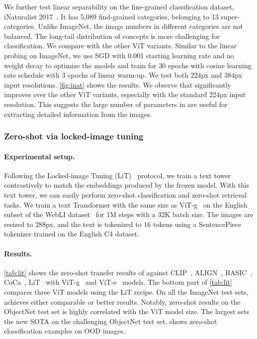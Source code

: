 We further test linear separability on the fine-grained classification dataset, iNaturalist 2017~\citep{cui2018large}. It has 5,089 find-grained categories, belonging to 13 super-categories. Unlike ImageNet, the image numbers in different categories are not balanced. The long-tail distribution of concepts is more challenging for classification. We compare \chonk with the other ViT variants. 
Similar to the linear probing on ImageNet, we use SGD with 0.001 starting learning rate and no weight decay to optimize the models and train for 30 epochs with cosine learning rate schedule with 3 epochs of linear warm-up. We test both $224$px and $384$px input resolutions. \cref{fig:inat} shows the results. We observe that \chonk significantly improves over the other ViT variants, especially with the standard $224$px input resolution. This suggests the large number of parameters in \chonk are useful for extracting detailed information from the images. 

\subsubsection{Zero-shot via locked-image tuning}
\label{sect::lit}
\paragraph{Experimental setup.}
Following the Locked-image Tuning (LiT)~\citep{lit} protocol, we train a text tower contrastively to match the embeddings produced by the frozen \chonk model.
With this text tower, we can easily perform zero-shot classification and zero-shot retrieval tasks.
We train a text Transformer with the same size as ViT-g~\citep{zhai2022scaling} on the English subset of the WebLI dataset~\citep{chen2022pali} for 1M steps with a 32K batch size.
The images are resized to $288$px, and the text is tokenized to 16 tokens using a SentencePiece~\citep{kudo-richardson-2018-sentencepiece} tokenizer trained on the English C4 dataset.

\paragraph{Results.}
\cref{tab:lit} shows the zero-shot transfer results of \chonk against CLIP~\citep{clip}, ALIGN~\citep{align}, BASIC~\citep{basic}, CoCa~\citep{yu2022coca}, LiT~\citep{lit} with ViT-g~\citep{zhai2022scaling} and ViT-e~\citep{chen2022pali} models. 
The bottom part of \cref{tab:lit} compares three ViT models using the LiT recipe.
On all the ImageNet test sets, \chonk{} achieves either comparable or better results. 
Notably, zero-shot results on the ObjectNet test set is highly correlated with the ViT model size. 
The largest \chonk{} sets the new SOTA on the challenging ObjectNet test set.
 shows zero-shot classification examples on OOD images.


